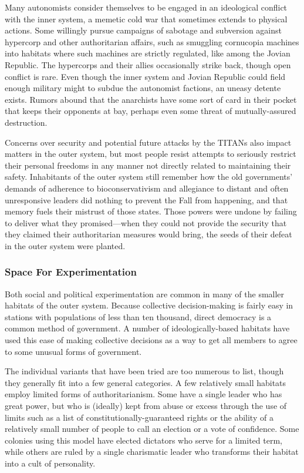 Many autonomists consider themselves to be 
engaged in an ideological conflict with the inner 
system, a memetic cold war that sometimes extends 
to physical actions. Some willingly pursue campaigns 
of sabotage and subversion against hypercorp and 
other authoritarian affairs, such as smuggling cornucopia machines into habitats where such machines 
are strictly regulated, like among the Jovian Republic. 
The hypercorps and their allies occasionally strike 
back, though open conflict is rare. Even though the 
inner system and Jovian Republic could field enough 
military might to subdue the autonomist factions, an 
uneasy detente exists. Rumors abound that the anarchists have some sort of card in their pocket that 
keeps their opponents at bay, perhaps even some 
threat of mutually-assured destruction.

Concerns over security and potential future attacks by the TITANs also impact matters in the outer 
system, but most people resist attempts to seriously 
restrict their personal freedoms in any manner not directly related to maintaining their safety. Inhabitants 
of the outer system still remember how the old governments' demands of adherence to bioconservativism 
and allegiance to distant and often unresponsive leaders did nothing to prevent the Fall from happening, 
and that memory fuels their mistrust of those states. 
Those powers were undone by failing to deliver what 
they promised—when they could not provide the security that they claimed their authoritarian measures 
would bring, the seeds of their defeat in the outer 
system were planted.

\subsubsection{Space For Experimentation}

Both social and political experimentation are common 
in many of the smaller habitats of the outer system. 
Because collective decision-making is fairly easy in 
stations with populations of less than ten thousand, 
direct democracy is a common method of government. 
A number of ideologically-based habitats have used 
this ease of making collective decisions as a way to 
get all members to agree to some unusual forms of 
government.

The individual variants that have been tried are 
too numerous to list, though they generally fit into 
a few general categories. A few relatively small habitats employ limited forms of authoritarianism. Some 
have a single leader who has great power, but who is 
(ideally) kept from abuse or excess through the use 
of limits such as a list of constitutionally-guaranteed 
rights or the ability of a relatively small number of 
people to call an election or a vote of confidence. 
Some colonies using this model have elected dictators 
who serve for a limited term, while others are ruled 
by a single charismatic leader who transforms their 
habitat into a cult of personality.

